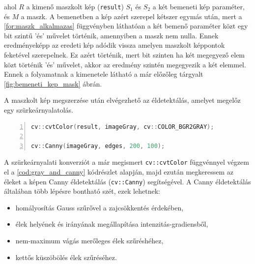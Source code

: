 \par ahol $R$ a kimenő maszkolt kép (\lstinline{result}) $S_1$ és $S_2$ a két bemeneti kép paraméter, és $M$ a maszk. A bemenetben a kép azért szerepel kétszer egymás után, mert a \ref{for:maszk_alkalmazas} függvényben láthatóan a két bemenő paraméter közt egy bit szintű 'és' művelet történik, amennyiben a maszk nem nulla. Ennek eredményeképp az eredeti kép adódik vissza amelyen maszkolt képpontok feketével szerepelnek. Ez azért történik, mert bit szinten ha két megegyező elem közt történik 'és' művelet, akkor az eredmény szintén megegyezik a két elemmel. Ennek a folyamatnak a kimenetele látható a már előzőleg tárgyalt \ref{fig:bemeneti_kep_mask} ábrán.
\par A maszkolt kép megszerzése után elvégezhető az éldetektálás, amelyet megelőz egy szürkeárnyalatolás.

\vspace{5mm}
\hspace{-10mm}
\begin{minipage}{\linewidth}
\begin{lstlisting}[language=C++, numbers=left, caption={Szürkeárnyalatolás és éldetektálás.}, label={cod:gray_and_canny}]
cv::cvtColor(result, imageGray, cv::COLOR_BGR2GRAY);

cv::Canny(imageGray, edges, 200, 100);
\end{lstlisting}
\end{minipage}

\par A szürkeárnyalati konverziót a már megismert \lstinline{cv::cvtColor} függvénnyel \cite{opencv_docs} végzem el a \ref{cod:gray_and_canny} kódrészlet alapján, majd ezután megkeressem az éleket a képen Canny éldetektálás \cite{opencv_docs, canny_edge_detection} (\lstinline{cv::Canny}) segítségével.
\newline A Canny éldetektálás általában több lépésre bontható szét, ezek lehetnek:

\begin{itemize}
    \setlength\itemsep{-2pt}
    \item homályosítás Gauss szűrővel \cite{shapiro2001} a zajcsökkentés érdekében,
    \item élek helyének és irányának megállapítása intenzitás-gradiensből,
    \item nem-maximum vágás merőleges élek szűréshéhez,
    \item kettős küszöbölés élek szűréséhez.
\end{itemize}

